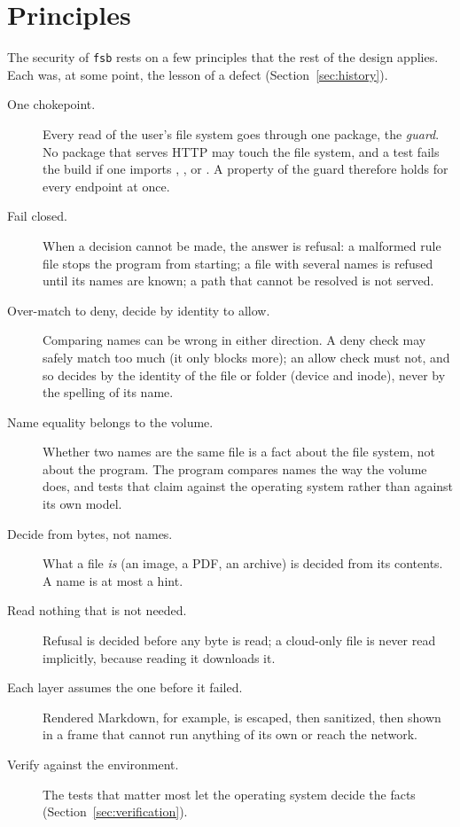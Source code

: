 \section{Principles}

The security of \texttt{fsb} rests on a few principles that the rest of the design
applies.  Each was, at some point, the lesson of a defect (Section~\ref{sec:history}).

\begin{description}
  \item[One chokepoint.]  Every read of the user's file system goes through one
        package, the \emph{guard}.  No package that serves HTTP may touch the file
        system, and a test fails the build if one imports , ,
         or .  A property of the guard therefore
        holds for every endpoint at once.
  \item[Fail closed.]  When a decision cannot be made, the answer is refusal:
        a malformed rule file stops the program from starting; a file with several
        names is refused until its names are known; a path that cannot be resolved is
        not served.
  \item[Over-match to deny, decide by identity to allow.]  Comparing names can be
        wrong in either direction.  A deny check may safely match too much (it only
        blocks more); an allow check must not, and so decides by the identity of the
        file or folder (device and inode), never by the spelling of its name.
  \item[Name equality belongs to the volume.]  Whether two names are the same file is
        a fact about the file system, not about the program.  The program compares
        names the way the volume does, and tests that claim against the operating
        system rather than against its own model.
  \item[Decide from bytes, not names.]  What a file \emph{is} (an image, a PDF, an
        archive) is decided from its contents.  A name is at most a hint.
  \item[Read nothing that is not needed.]  Refusal is decided before any byte is
        read; a cloud-only file is never read implicitly, because reading it downloads
        it.
  \item[Each layer assumes the one before it failed.]  Rendered Markdown, for
        example, is escaped, then sanitized, then shown in a frame that cannot run
        anything of its own or reach the network.
  \item[Verify against the environment.]  The tests that matter most let the
        operating system decide the facts (Section~\ref{sec:verification}).
\end{description}

